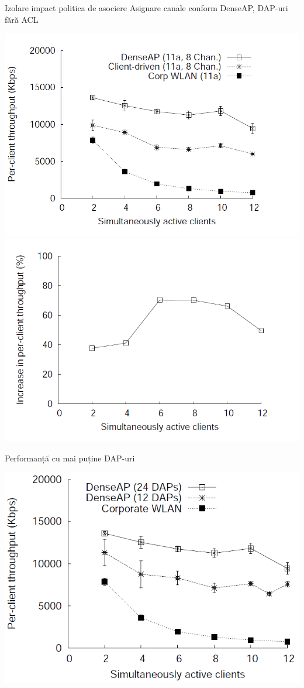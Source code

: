 \begin{frame}{Izolare impact politica de asociere}
  Asignare canale conform DenseAP, DAP-uri fără ACL
  \begin{center}
    \includegraphics[scale=0.21]{img/fig13.png}
    \includegraphics[scale=0.21]{img/fig14.png}
  \end{center}
\end{frame}

\begin{frame}{Performanță cu mai puține DAP-uri}
  \begin{center}
    \includegraphics[scale=0.35]{img/fig16.png}
  \end{center}
\end{frame}

